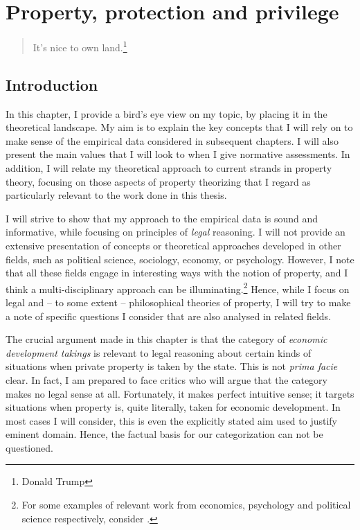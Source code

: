 \chapter{Property, protection and privilege}\label{chap:1}

\begin{quote}
It's nice to own land.\footnote{Donald Trump}
\end{quote}

\section{Introduction}

In this chapter, I provide a bird's eye view on my topic, by placing it in the theoretical landscape. My aim is to explain the key concepts that I will rely on to make sense of the empirical data considered in subsequent chapters. I will also present the main values that I will look to when I give normative assessments. In addition, I will relate my theoretical approach to current strands in property theory, focusing on those aspects of property theorizing that I regard as particularly relevant to the work done in this thesis.

I will strive to show that my approach to the empirical data is sound and informative, while focusing on principles of {\it legal} reasoning. I will not provide an extensive presentation of concepts or theoretical approaches developed in other fields, such as political science, sociology, economy, or psychology. However, I note that all these fields engage in interesting ways with the notion of property, and I think a multi-disciplinary approach can be illuminating.\footnote{For some examples of relevant work from economics, psychology and political science respectively, consider \cite{miceli11,nadler08,katz97,carruthers04}.} Hence, while I focus on legal and --  to some extent -- philosophical theories of property, I will try to make a note of specific questions I consider that are also analysed in related fields.

The crucial argument made in this chapter is that the category of {\it economic development takings} is relevant to legal reasoning about certain kinds of situations when private property is taken by the state. This is not {\it prima facie} clear. In fact, I am prepared to face critics who will argue that the category makes no legal sense at all. Fortunately, it makes perfect intuitive sense; it targets situations when property is, quite literally, taken for economic development. In most cases I will consider, this is even the explicitly stated aim used to justify eminent domain. Hence, the factual basis for our categorization can not be questioned.

